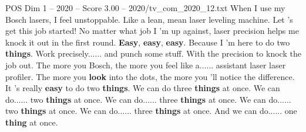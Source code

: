 \begin{textsample}{POS Dim 1 – 2020 – Score 3.00 – 2020/tv\_com\_2020\_12.txt}  \label{ex:f1_pos_090}
When I use my Bosch lasers, I feel unstoppable.
Like a lean, mean laser leveling machine.
Let 's get this job started!
No matter what job I 'm up against, laser precision helps me knock it out in the first round. \textbf{Easy}, \textbf{easy}, \textbf{easy}.
Because I 'm here to do two \textbf{things}.
Work precisely...... and punch some stuff.
With the precision to knock the job out.
The more you Bosch, the more you feel like a...... assistant laser laser profiler.
The more you \textbf{look} into the dots, the more you 'll notice the difference.
It 's really \textbf{easy} to do two \textbf{things}.
We can do three \textbf{things} at once.
We can do...... two \textbf{things} at once.
We can do...... three \textbf{things} at once.
We can do...... two \textbf{things} at once.
We can do...... three \textbf{things} at once.
And we can do...... one \textbf{thing} at once.

\end{textsample}
